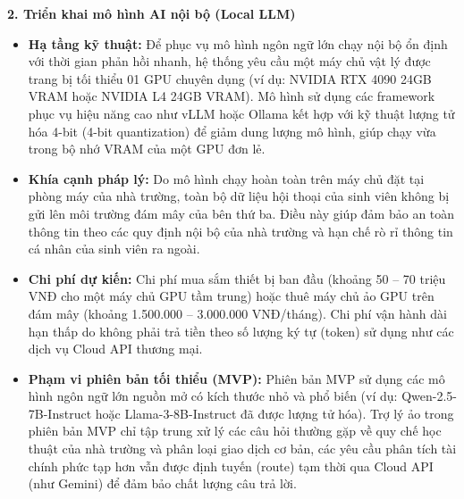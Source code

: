 \textbf{2. Triển khai mô hình AI nội bộ (Local LLM)}
\begin{itemize}
    \item \textbf{Hạ tầng kỹ thuật:} Để phục vụ mô hình ngôn ngữ lớn chạy nội bộ ổn định với thời gian phản hồi nhanh, hệ thống yêu cầu một máy chủ vật lý được trang bị tối thiểu 01 GPU chuyên dụng (ví dụ: NVIDIA RTX 4090 24GB VRAM hoặc NVIDIA L4 24GB VRAM). Mô hình sử dụng các framework phục vụ hiệu năng cao như vLLM hoặc Ollama kết hợp với kỹ thuật lượng tử hóa 4-bit (4-bit quantization) để giảm dung lượng mô hình, giúp chạy vừa trong bộ nhớ VRAM của một GPU đơn lẻ.
    \item \textbf{Khía cạnh pháp lý:} Do mô hình chạy hoàn toàn trên máy chủ đặt tại phòng máy của nhà trường, toàn bộ dữ liệu hội thoại của sinh viên không bị gửi lên môi trường đám mây của bên thứ ba. Điều này giúp đảm bảo an toàn thông tin theo các quy định nội bộ của nhà trường và hạn chế rò rỉ thông tin cá nhân của sinh viên ra ngoài.
    \item \textbf{Chi phí dự kiến:} Chi phí mua sắm thiết bị ban đầu (khoảng 50 -- 70 triệu VNĐ cho một máy chủ GPU tầm trung) hoặc thuê máy chủ ảo GPU trên đám mây (khoảng 1.500.000 -- 3.000.000 VNĐ/tháng). Chi phí vận hành dài hạn thấp do không phải trả tiền theo số lượng ký tự (token) sử dụng như các dịch vụ Cloud API thương mại.
    \item \textbf{Phạm vi phiên bản tối thiểu (MVP):} Phiên bản MVP sử dụng các mô hình ngôn ngữ lớn nguồn mở có kích thước nhỏ và phổ biến (ví dụ: Qwen-2.5-7B-Instruct hoặc Llama-3-8B-Instruct đã được lượng tử hóa). Trợ lý ảo trong phiên bản MVP chỉ tập trung xử lý các câu hỏi thường gặp về quy chế học thuật của nhà trường và phân loại giao dịch cơ bản, các yêu cầu phân tích tài chính phức tạp hơn vẫn được định tuyến (route) tạm thời qua Cloud API (như Gemini) để đảm bảo chất lượng câu trả lời.
\end{itemize}
